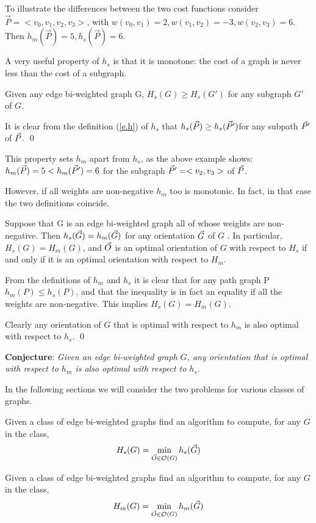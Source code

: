  To illustrate the differences between the two cost functions consider\\
 $\vec{P}=<v_0,v_1,v_2,v_3>$, with $w(v_0,v_1)=2, w(v_1,v_2)=-3,w(v_2,v_3)=6$.
 Then $h_m(\vec{P})=5, h_s(\vec{P})=6$.

A very useful property of $h_s$ is that it is monotone: the cost of a graph is never less than the cost of a subgraph.
\begin{lemma}
	Given any edge bi-weighted graph G,
	$H_{s}(G)\geq  H_{s}(G')$ for any subgraph $G'$ of $G$. 
\end{lemma}

It is clear from the definition (\ref{e.h}) of $h_s$ that $h_s(\vec{P})\geq h_s(\vec{P} ')$for any subpath 
$\vec{P} '$ of $\vec{P}$.  
\qed

This property sets $h_m$ apart from $h_s$,  as the above example shows:
$h_{m}(\vec{P})=5 <  h_{m}(\vec{P}')=6$ for the subgraph $\vec{P} '=<v_2,v_3>$ of $\vec{P}$.

However, if all weights are non-negative $h_m$ too is monotonic. In fact, in that case the two definitions coincide.

\begin{lemma}
	Suppose that G is an edge bi-weighted graph  all of whose weights are non-negative.
	Then $h_{s}( \vec{G} )= h_{m}( \vec{G} )$ for any orientation $\vec{G}$ of $G$ .
	In particular,  $H_{s}(G)= H_{m}(G)$,  and 
	$\vec{O}$ is an optimal orientation of $G$ with respect to $H_{s}$
	if and only if it is an optimal orientation with respect to $ H_{m} $.
\end{lemma}
From the definitions of $h_m$ and $h_s$ it is clear that for any path graph P  $h_{m}(P)\leq  h_{s}(P)$, and that the inequality is in fact an equality if all the weights 
are non-negative. This implies $H_{s}(G)= H_{m}(G)$.

Clearly any orientation of $G$ that is optimal with respect to $h_m$ is also 
optimal with respect to $h_s$. 
\qed

\bigskip
{\bf Conjecture}:
\textit{Given an edge bi-weighted graph $G$, any orientation that is optimal with 
	respect to $h_{m}$ is also optimal with respect to $h_{s} $.}

\bigskip
In the following sections we will consider the two problems
for various classes of graphs.

\begin{problem}
	Given a class of edge bi-weighted graphs find an algorithm to compute, for any $G$
	in the class,  
	$$
	H_s(G) = \min_{\vec{O} \in \mathcal{O}(G)} h_s(\vec{G})
	$$
\end{problem}

\begin{problem}
	Given a class of edge bi-weighted graphs find an algorithm to compute, for any $G$
	in the class,  
	$$
H_m(G) = \min_{\vec{O} \in \mathcal{O}(G)} h_m (\vec{G})
	$$
\end{problem}
